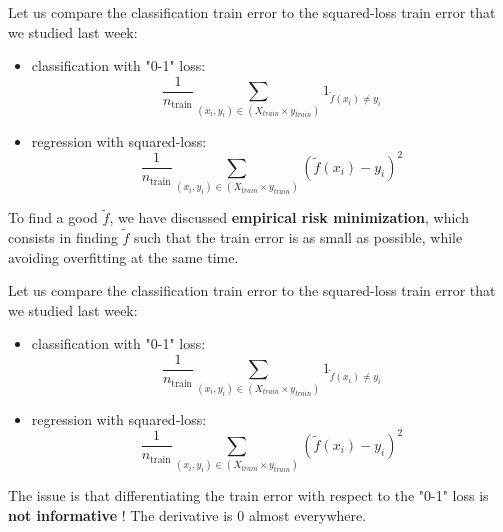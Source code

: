 \documentclass[usenames,dvipsnames,french]{beamer}
\begin{document}
\begin{frame}
    Let us compare the classification train error to the squared-loss train error that we studied last week:

    \begin{itemize}
    	\item classification with "0-1" loss:
	    \begin{equation}
		\frac{1}{n_{\text{train}}}\sum_{(x_i, y_i)\in (X_{train}\times y_{train})} 1_{{\tilde{f}(x_i)\neq y_i}}
	    \end{equation}
	\item regression with squared-loss:
	    \begin{equation}
		\frac{1}{n_{\text{train}}}\sum_{(x_i, y_i)\in (X_{train}\times y_{train})} (\tilde{f}(x_i)-y_i)^2
	    \end{equation}
    \end{itemize}

    To find a good $\tilde{f}$, we have discussed \textbf{empirical risk minimization}, which consists in finding $\tilde{f}$ such that the train error is as small as possible, while avoiding overfitting at the same time.

\end{frame}

\begin{frame}
    Let us compare the classification train error to the squared-loss train error that we studied last week:

    \begin{itemize}
    	\item classification with "0-1" loss:
	    \begin{equation}
		\frac{1}{n_{\text{train}}}\sum_{(x_i, y_i)\in (X_{train}\times y_{train})} 1_{{\tilde{f}(x_i)\neq y_i}}
	    \end{equation}
	\item regression with squared-loss:
	    \begin{equation}
		\frac{1}{n_{\text{train}}}\sum_{(x_i, y_i)\in (X_{train}\times y_{train})} (\tilde{f}(x_i)-y_i)^2
	    \end{equation}
    \end{itemize}

    The issue is that differentiating the train error with respect to the "0-1" loss is \textbf{not informative} ! The derivative is $0$ almost everywhere.


\end{frame}
\end{document}
